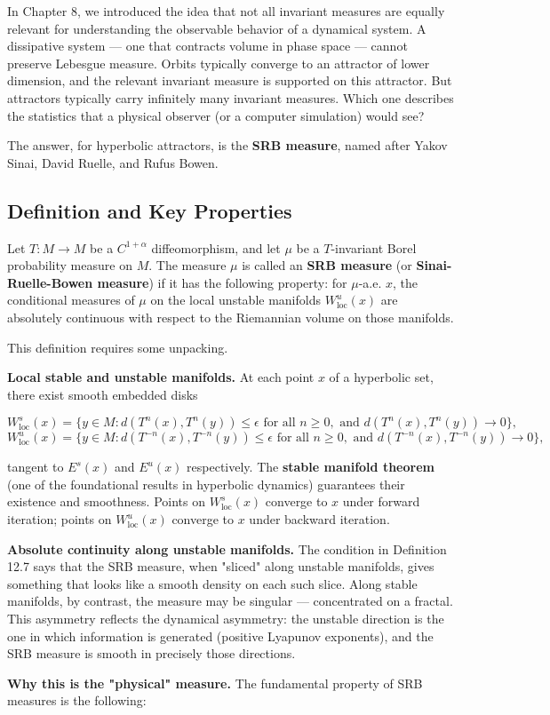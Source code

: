In Chapter 8, we introduced the idea that not all invariant measures are equally relevant for understanding the observable behavior of a dynamical system. A dissipative system --- one that contracts volume in phase space --- cannot preserve Lebesgue measure. Orbits typically converge to an attractor of lower dimension, and the relevant invariant measure is supported on this attractor. But attractors typically carry infinitely many invariant measures. Which one describes the statistics that a physical observer (or a computer simulation) would see?

The answer, for hyperbolic attractors, is the \textbf{SRB measure}, named after Yakov Sinai, David Ruelle, and Rufus Bowen.

\subsection{Definition and Key Properties}\label{sec:12.2.2}

\begin{definition}\label{def:12.7}
Let $T: M \to M$ be a $C^{1+\alpha}$ diffeomorphism, and let $\mu$ be a $T$-invariant Borel probability measure on $M$. The measure $\mu$ is called an \textbf{SRB measure} (or \textbf{Sinai-Ruelle-Bowen measure}) if it has the following property: for $\mu$-a.e. $x$, the conditional measures of $\mu$ on the local unstable manifolds $W^u_{\text{loc}}(x)$ are absolutely continuous with respect to the Riemannian volume on those manifolds.

This definition requires some unpacking.

\textbf{Local stable and unstable manifolds.} At each point $x$ of a hyperbolic set, there exist smooth embedded disks

\[
W^s_{\text{loc}}(x) = \{y \in M : d(T^n(x), T^n(y)) \leq \epsilon \text{ for all } n \geq 0, \text{ and } d(T^n(x), T^n(y)) \to 0\},
\]
\[
W^u_{\text{loc}}(x) = \{y \in M : d(T^{-n}(x), T^{-n}(y)) \leq \epsilon \text{ for all } n \geq 0, \text{ and } d(T^{-n}(x), T^{-n}(y)) \to 0\},
\]

tangent to $E^s(x)$ and $E^u(x)$ respectively. The \textbf{stable manifold theorem} (one of the foundational results in hyperbolic dynamics) guarantees their existence and smoothness. Points on $W^s_{\text{loc}}(x)$ converge to $x$ under forward iteration; points on $W^u_{\text{loc}}(x)$ converge to $x$ under backward iteration.

\textbf{Absolute continuity along unstable manifolds.} The condition in Definition 12.7 says that the SRB measure, when "sliced" along unstable manifolds, gives something that looks like a smooth density on each such slice. Along stable manifolds, by contrast, the measure may be singular --- concentrated on a fractal. This asymmetry reflects the dynamical asymmetry: the unstable direction is the one in which information is generated (positive Lyapunov exponents), and the SRB measure is smooth in precisely those directions.

\textbf{Why this is the "physical" measure.} The fundamental property of SRB measures is the following:
\end{definition}


